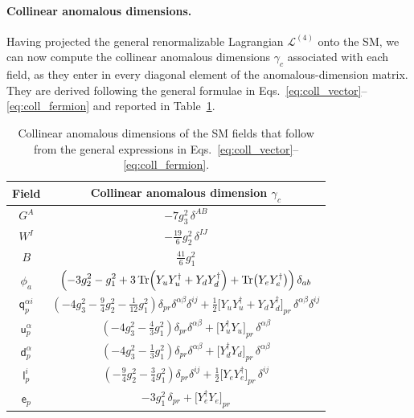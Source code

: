 \paragraph{Collinear anomalous dimensions.}
Having projected the general renormalizable Lagrangian $\mathcal L^{(4)}$ onto the SM, we can now compute the collinear anomalous dimensions $\gamma_c$ associated with each field, as they enter in every diagonal element of the anomalous-dimension matrix. They are derived following the general formulae in Eqs.~\eqref{eq:coll_vector}--\eqref{eq:coll_fermion} and reported in Table~\ref{tab:collinear_SM}.

\begin{table}[tb]
\centering
\renewcommand{\arraystretch}{2.0}
\begin{tabular}{cc}
\toprule
\rowcolor{hdrcolor}
\textbf{Field} & \textbf{Collinear anomalous dimension $\gamma_c$} \\
\midrule
$G^A$ & $\displaystyle -7g_3^2\,\delta^{AB}$ \\
$W^I$ & $\displaystyle -\frac{19}{6}g_2^2\,\delta^{IJ}$ \\
$B$ & $\displaystyle \frac{41}{6}g_1^2$ \\
\midrule
$\phi_a$ & $\displaystyle \left(-3g_2^2 - g_1^2 + 3 \Tr(Y_u Y_u^\dagger + Y_d Y_d^\dagger)+\Tr(Y_e Y_e^\dagger)\right)\delta_{ab}$ \\
\midrule
$\mathsf{q}^{\alpha i}_p$ & $\displaystyle \left(-4g_3^2 - \frac{9}{4}g_2^2 - \frac{1}{12}g_1^2\right)\delta_{pr}\delta^{\alpha\beta}\delta^{ij} + \frac{1}{2}\big[Y_uY_u^\dagger + Y_dY_d^\dagger\big]_{pr}\,\delta^{\alpha\beta}\delta^{ij}$ \\
$\mathsf{u}^{\alpha}_p$ & $\displaystyle \left(-4g_3^2 - \frac{4}{3}g_1^2\right)\delta_{pr}\delta^{\alpha\beta} + \big[Y_u^\dagger Y_u\big]_{pr}\,\delta^{\alpha\beta}$ \\
$\mathsf{d}^{\alpha}_p$ & $\displaystyle \left(-4g_3^2 - \frac{1}{3}g_1^2\right)\delta_{pr}\delta^{\alpha\beta} + \big[Y_d^\dagger Y_d\big]_{pr}\,\delta^{\alpha\beta}$ \\
$\mathsf{l}^{i}_p$ & $\displaystyle \left(-\frac{9}{4}g_2^2 - \frac{3}{4}g_1^2\right)\delta_{pr}\delta^{ij} + \frac{1}{2}\big[Y_eY_e^\dagger\big]_{pr}\,\delta^{ij}$ \\
$\mathsf{e}_p$ & $\displaystyle -3g_1^2\,\delta_{pr} + \big[Y_e^\dagger Y_e\big]_{pr}$ \\
\bottomrule
\end{tabular}
\caption{Collinear anomalous dimensions of the SM fields that follow from the general expressions in Eqs.~\eqref{eq:coll_vector}--\eqref{eq:coll_fermion}.}
\label{tab:collinear_SM}
\end{table}

